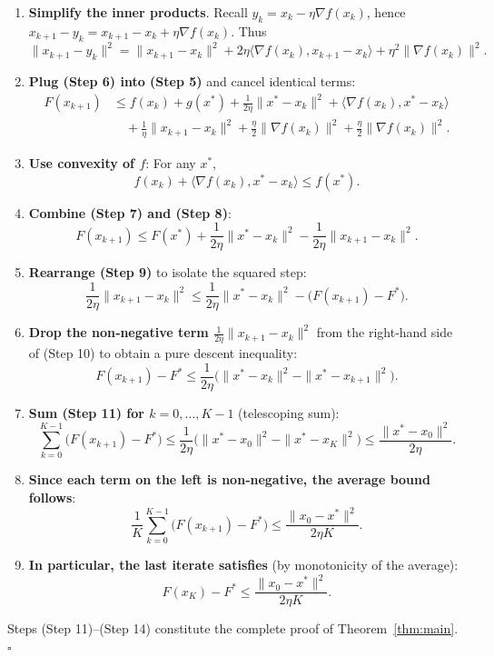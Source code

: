\documentclass{article}
\begin{document}
\begin{enumerate}
\item \textbf{Simplify the inner products}.  
Recall $y_{k}=x_{k}-\eta\nabla f(x_{k})$, hence $x_{k+1}-y_{k}=x_{k+1}-x_{k}+\eta\nabla f(x_{k})$.  
Thus
\[
\|x_{k+1}-y_{k}\|^{2}
=\|x_{k+1}-x_{k}\|^{2}+2\eta\langle\nabla f(x_{k}),x_{k+1}-x_{k}\rangle+\eta^{2}\|\nabla f(x_{k})\|^{2}.
\tag{Step 6}
\]

\item \textbf{Plug (Step 6) into (Step 5)} and cancel identical terms:
\[
\begin{aligned}
F(x_{k+1}) 
&\le f(x_{k})+g(x^{*})+\frac{1}{2\eta}\|x^{*}-x_{k}\|^{2}
+\langle\nabla f(x_{k}),x^{*}-x_{k}\rangle\\
&\quad+\frac{1}{\eta}\|x_{k+1}-x_{k}\|^{2}
+\frac{\eta}{2}\|\nabla f(x_{k})\|^{2}
+\frac{\eta}{2}\|\nabla f(x_{k})\|^{2}.
\end{aligned}
\tag{Step 7}
\]

\item \textbf{Use convexity of $f$}:  
For any $x^{*}$,
\[
f(x_{k})+ \langle\nabla f(x_{k}),x^{*}-x_{k}\rangle\le f(x^{*}).
\tag{Step 8}
\]

\item \textbf{Combine (Step 7) and (Step 8)}:
\[
F(x_{k+1}) \le F(x^{*})+\frac{1}{2\eta}\|x^{*}-x_{k}\|^{2}
-\frac{1}{2\eta}\|x_{k+1}-x_{k}\|^{2}.
\tag{Step 9}
\]

\item \textbf{Rearrange (Step 9)} to isolate the squared step:
\[
\frac{1}{2\eta}\|x_{k+1}-x_{k}\|^{2}
\le \frac{1}{2\eta}\|x^{*}-x_{k}\|^{2}-\bigl(F(x_{k+1})-F^{*}\bigr).
\tag{Step 10}
\]

\item \textbf{Drop the non‑negative term $\frac{1}{2\eta}\|x_{k+1}-x_{k}\|^{2}$} from the right‑hand side of (Step 10) to obtain a pure descent inequality:
\[
F(x_{k+1})-F^{*}\le \frac{1}{2\eta}\bigl(\|x^{*}-x_{k}\|^{2}-\|x^{*}-x_{k+1}\|^{2}\bigr).
\tag{Step 11}
\]

\item \textbf{Sum (Step 11) for $k=0,\dots, K-1$} (telescoping sum):
\[
\sum_{k=0}^{K-1}\bigl(F(x_{k+1})-F^{*}\bigr)
\le \frac{1}{2\eta}\bigl(\|x^{*}-x_{0}\|^{2}-\|x^{*}-x_{K}\|^{2}\bigr)
\le \frac{\|x^{*}-x_{0}\|^{2}}{2\eta}.
\tag{Step 12}
\]

\item \textbf{Since each term on the left is non‑negative, the average bound follows}:
\[
\frac{1}{K}\sum_{k=0}^{K-1}\bigl(F(x_{k+1})-F^{*}\bigr)
\le \frac{\|x_{0}-x^{*}\|^{2}}{2\eta K}.
\tag{Step 13}
\]

\item \textbf{In particular, the last iterate satisfies} (by monotonicity of the average):
\[
F(x_{K})-F^{*}\le \frac{\|x_{0}-x^{*}\|^{2}}{2\eta K}.
\tag{Step 14}
\]

\end{enumerate}
Steps (Step 11)–(Step 14) constitute the complete proof of Theorem~\ref{thm:main}. $\square$
\end{document}
